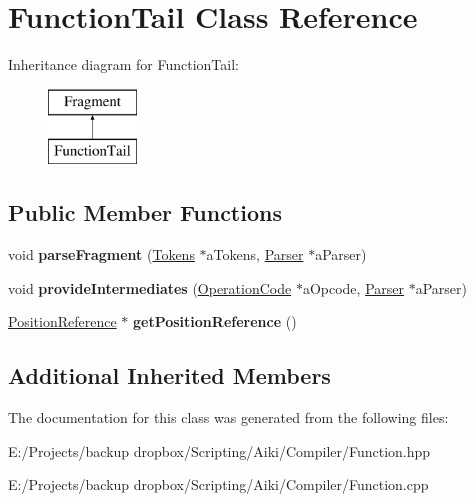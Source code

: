 \hypertarget{a00012}{\section{Function\+Tail Class Reference}
\label{a00012}
}
Inheritance diagram for Function\+Tail\+:\begin{figure}[H]
\begin{center}
\leavevmode
\includegraphics[height=2.000000cm]{df/d86/a00012}
\end{center}
\end{figure}
\subsection*{Public Member Functions}
\begin{DoxyCompactItemize}
\item 
\hypertarget{a00012_a903ff1fe2254630df3fa6b13424a32da}{void {\bfseries parse\+Fragment} (\hyperlink{a00026}{Tokens} $\ast$a\+Tokens, \hyperlink{a00017}{Parser} $\ast$a\+Parser)}\label{a00012_a903ff1fe2254630df3fa6b13424a32da}

\item 
\hypertarget{a00012_a1d05757a48e27d1cb8cca922f7303044}{void {\bfseries provide\+Intermediates} (\hyperlink{a00015}{Operation\+Code} $\ast$a\+Opcode, \hyperlink{a00017}{Parser} $\ast$a\+Parser)}\label{a00012_a1d05757a48e27d1cb8cca922f7303044}

\item 
\hypertarget{a00012_af930cde44d6b891ff83abc154d246e95}{\hyperlink{a00019}{Position\+Reference} $\ast$ {\bfseries get\+Position\+Reference} ()}\label{a00012_af930cde44d6b891ff83abc154d246e95}

\end{DoxyCompactItemize}
\subsection*{Additional Inherited Members}


The documentation for this class was generated from the following files\+:\begin{DoxyCompactItemize}
\item 
E\+:/\+Projects/backup dropbox/\+Scripting/\+Aiki/\+Compiler/Function.\+hpp\item 
E\+:/\+Projects/backup dropbox/\+Scripting/\+Aiki/\+Compiler/Function.\+cpp\end{DoxyCompactItemize}
